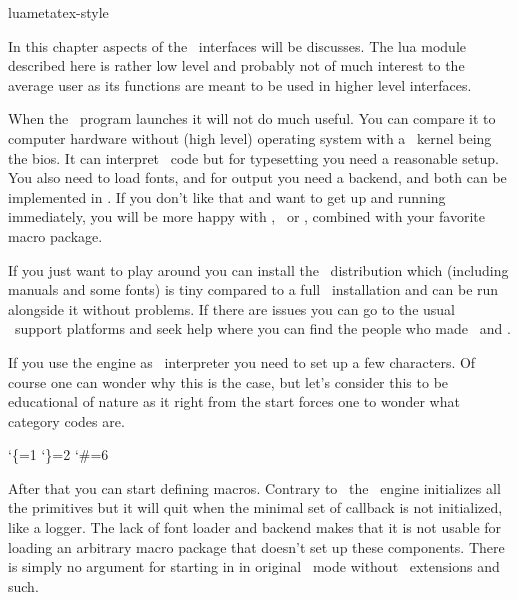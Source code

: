 
\environment luametatex-style

\startdocument[title=\LUA]

\startsubject[title=Contents]
    \setups[sectioncontents]
\stopsubject

\startsection[title={Introduction}]

In this chapter aspects of the \LUA\ interfaces will be discusses. The \type
{lua} module described here is rather low level and probably not of much interest
to the average user as its functions are meant to be used in higher level
interfaces.

\stopsection

\startsection[title={Initialization}]

\startsubsection[title={A bare bone engine}]

When the \LUAMETATEX\ program launches it will not do much useful. You can
compare it to computer hardware without (high level) operating system with a
\TEX\ kernel being the bios. It can interpret \TEX\ code but for typesetting you
need a reasonable setup. You also need to load fonts, and for output you need a
backend, and both can be implemented in \LUA. If you don't like that and want to
get up and running immediately, you will be more happy with \LUATEX, \PDFTEX\ or
\XETEX, combined with your favorite macro package.

If you just want to play around you can install the \CONTEXT\ distribution which
(including manuals and some fonts) is tiny compared to a full \TEXLIVE\
installation and can be run alongside it without problems. If there are issues
you can go to the usual \CONTEXT\ support platforms and seek help where you can
find the people who made \LUATEX\ and \LUAMETATEX.

If you use the engine as \TEX\ interpreter you need to set up a few characters.
Of course one can wonder why this is the case, but let's consider this to be
educational of nature as it right from the start forces one to wonder what
category codes are.

\starttyping
\catcode`\{=1 \catcode`\}=2 \catcode`\#=6
\stoptyping

After that you can start defining macros. Contrary to \LUATEX\ the \LUAMETATEX\
engine initializes all the primitives but it will quit when the minimal set of
callback is not initialized, like a logger. The lack of font loader and backend
makes that it is not usable for loading an arbitrary macro package that doesn't
set up these components. There is simply no argument for starting in in original
\TEX\ mode without \ETEX\ extensions and such.

